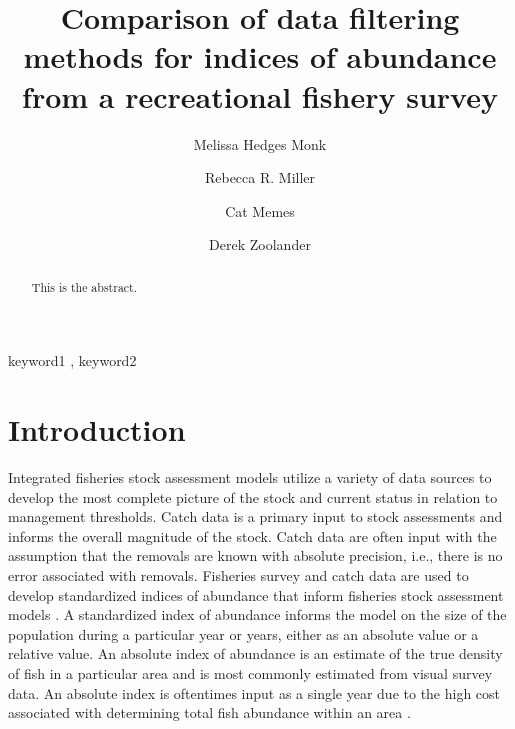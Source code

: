 \documentclass[
  authoryear,
  preprint,
  3p]{elsarticle}
\begin{document}
\begin{frontmatter}
\title{Comparison of data filtering methods for indices of abundance
from a recreational fishery survey}
\author[1]{Melissa Hedges Monk%
%
}
\author[2]{Rebecca R. Miller%
%
}
\author[2]{Cat Memes%
%
}
\author[]{Derek Zoolander%
%
}





        
\begin{abstract}
This is the abstract.
\end{abstract}





\begin{keyword}
    keyword1 \sep 
    keyword2
\end{keyword}
\end{frontmatter}\ifdefined\Shaded\renewenvironment{Shaded}{\begin{tcolorbox}[frame hidden, enhanced, borderline west={3pt}{0pt}{shadecolor}, breakable, boxrule=0pt, sharp corners, interior hidden]}{\end{tcolorbox}}\fi

\hypertarget{introduction}{%
\section{Introduction}\label{introduction}}

Integrated fisheries stock assessment models utilize a variety of data
sources to develop the most complete picture of the stock and current
status in relation to management thresholds. Catch data is a primary
input to stock assessments and informs the overall magnitude of the
stock. Catch data are often input with the assumption that the removals
are known with absolute precision, i.e., there is no error associated
with removals. Fisheries survey and catch data are used to develop
standardized indices of abundance that inform fisheries stock assessment
models \citep{Maunder:2004:SCE}. A standardized index of abundance
informs the model on the size of the population during a particular year
or years, either as an absolute value or a relative value. An absolute
index of abundance is an estimate of the true density of fish in a
particular area and is most commonly estimated from visual survey data.
An absolute index is oftentimes input as a single year due to the high
cost associated with determining total fish abundance within an area
\citep{Love:2009:DFA}.
\end{document}
